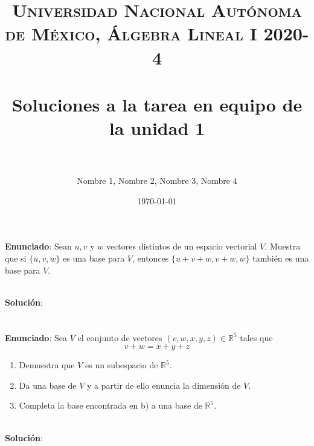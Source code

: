 \documentclass{article} %
\title{	
\normalfont \normalsize 
\textsc{Universidad Nacional Autónoma de México, Álgebra Lineal I 2020-4} \\ %
\horrule{0.5pt} \\[0.4cm] %
\huge Soluciones a la tarea en equipo de la unidad 1 \\ %
\horrule{2pt} \\[0.5cm] %
}
\author{Nombre 1, Nombre 2, Nombre 3, Nombre 4} %
\date{\normalsize\today} %
\begin{document}
\maketitle %

\section{}

\textbf{Enunciado}: Sean $u, v$ y $w$ vectores distintos de un espacio vectorial $V$. Muestra que si $\{u, v, w\}$ es una base para $V$, entonces $\{u+v+w, v+w, w\}$ también es una base para $V$.

\\
\vspace{10 mm}
\textbf{Solución}:


				

\section{}

\textbf{Enunciado}: Sea $V$ el conjunto de vectores $(v, w, x, y, z) \in \mathbb{R}^{5}$ tales que $$v+w=x+y+z$$

\begin{enumerate}[label=(\alph*)]
\item Demuestra que $V$ es un subespacio de $\mathbb{R}^{5}$.
\item Da una base de $V$ y a partir de ello enuncia la dimensión de $V$.
\item Completa la base encontrada en b) a una base de $\mathbb{R}^{5}$.
\end{enumerate}


\\
\vspace{10 mm}
\textbf{Solución}:

				

\end{document}
